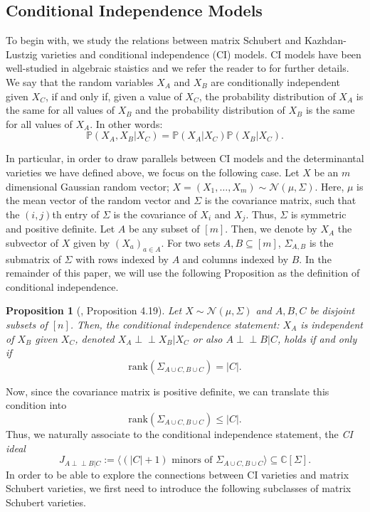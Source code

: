 \documentclass[11pt]{amsart}
\newtheorem{proposition}[theorem]{Proposition}
\theoremstyle{definition}
\theoremstyle{definition}
\theoremstyle{definition}
\theoremstyle{definition}
\newcommand{\indep}{\perp \!\!\! \perp}
\begin{document}
\subsection{Conditional Independence Models}\label{subsec: ci models}
\noindent To begin with, we study the relations between matrix Schubert and Kazhdan-Lustzig varieties  and conditional independence (CI) models. CI models have been well-studied in algebraic staistics and we refer the reader to \cite[Chapter 4]{sullivant2023algebraic} for further details. We say that the random variables $X_A$ and $X_B$ are conditionally independent given $X_C$, if and only if, given a value of $X_C$, the probability distribution of $X_A$ is the same for all values of $X_B$ and the probability distribution of $X_B$ is the same for all values of $X_A$. In other words:
$$\mathbb{P}(X_A,X_B|X_C) = \mathbb{P}(X_A|X_C)\mathbb{P}(X_B|X_C).$$

In particular, in order to draw parallels between CI models and the determinantal varieties we have defined above, we focus on the following case. Let $X$ be an $m$ dimensional Gaussian random vector; $X=(X_1,\ldots,X_m) \sim \mathcal{N}(\mu, \Sigma)$. Here, $\mu$ is the mean vector of the random vector and $\Sigma$ is the covariance matrix, such that the $(i,j)$th entry of $\Sigma$ is the covariance of $X_i$ and $X_j$. Thus, $\Sigma$ is symmetric and positive definite. Let $A$ be any subset of $[m]$. Then, we denote by $X_A$ the subvector of $X$ given by $(X_a)_{a\in A}$. For two sets $A, B \subseteq[m]$, $\Sigma_{A,B}$ is the submatrix of $\Sigma$ with rows indexed by $A$ and columns indexed by $B$. In the remainder of this paper, we will use the following Proposition as the definition of conditional independence. 

\begin{proposition}[{\cite{sullivant2023algebraic}}, Proposition 4.19]
    Let $X \sim \mathcal{N}(\mu, \Sigma)$ and $A,B,C$ be disjoint subsets of $[n]$. Then, the conditional independence statement: $X_A$ is independent of $X_B$ given $X_C$, denoted $X_A\indep X_B | X_C$ or also $A \indep B | C$, holds if and only if
    $$ \mathrm{rank } (\Sigma_{A\cup C, B\cup C})= | C|.$$
\end{proposition}
\noindent Now, since the covariance matrix is positive definite, we can translate this condition into 
$$ \mathrm{rank } (\Sigma_{A\cup C, B\cup C} )\leq | C|.$$
Thus, we naturally associate to the conditional independence statement, the \emph{CI ideal}
$$J_{A\indep B | C} := \langle (|C| + 1) \text{ minors of } \Sigma_{A\cup C, B\cup C} \rangle \subseteq \mathbb{C}[\Sigma].$$
In order to be able to explore the connections between CI varieties and matrix Schubert varieties, we first need to introduce the following subclasses of matrix Schubert varieties.
\end{document}
